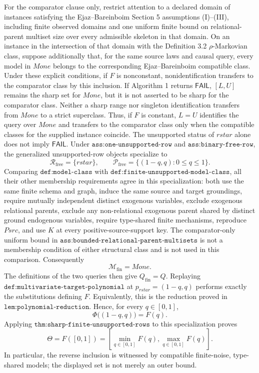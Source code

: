 For the comparator clause only, restrict attention to a declared domain of instances satisfying the Ejaz--Bareinboim Section 5 assumptions (I)--(III), including finite observed domains and one uniform finite bound on relational-parent multiset size over every admissible skeleton in that domain.  On an instance in the intersection of that domain with the Definition 3.2 \(\rho\)-Markovian class, suppose additionally that, for the same source laws and causal query, every model in \(Mone\) belongs to the corresponding Ejaz--Bareinboim compatible class.  Under these explicit conditions, if \(F\) is nonconstant, nonidentification transfers to the comparator class by this inclusion.  If Algorithm 1 returns \(\mathsf{FAIL}\), \([L,U]\) remains the sharp set for \(Mone\), but it is not asserted to be sharp for the comparator class.  Neither a sharp range nor singleton identification transfers from \(Mone\) to a strict superclass.  Thus, if \(F\) is constant, \(L=U\) identifies the query over \(Mone\) and transfers to the comparator class only when the compatible classes for the supplied instance coincide.  The unsupported status of \(rstar\) alone does not imply \(\mathsf{FAIL}\).
Under \(\texttt{ass:one-unsupported-row}\) and
\(\texttt{ass:binary-free-row}\), the generalized unsupported-row objects
specialize to
\[
 \mathcal R_{\mathrm{free}}=\{rstar\},
 \qquad
 \mathcal P_{\mathrm{free}}
 =\{(1-q,q):0\leq q\leq 1\}.
\]
Comparing \(\texttt{def:model-class}\) with
\(\texttt{def:finite-unsupported-model-class}\), all their other
membership requirements agree in this specialization: both use the same
finite schema and graph, induce the same source and target groundings,
require mutually independent distinct exogenous variables, exclude
exogenous relational parents, exclude any non-relational exogenous parent
shared by distinct ground endogenous variables, require type-shared finite
mechanisms, reproduce \(Psrc\), and use \(K\) at every
positive-source-support key.  The comparator-only uniform bound in
\(\texttt{ass:bounded-relational-parent-multisets}\) is not a membership
condition of either structural class and is not used in this comparison.
Consequently
\[
 \mathcal M_{\mathrm{fin}}=Mone.
\]
The definitions of the two queries then give
\(Q_{\mathrm{fin}}=Q\).  Replaying
\(\texttt{def:multivariate-target-polynomial}\) at
\(p_{rstar}=(1-q,q)\) performs exactly the substitutions defining \(F\).
Equivalently, this is the reduction proved in
\(\texttt{lem:polynomial-reduction}\).  Hence, for every \(q\in[0,1]\),
\[
 \Phi\bigl((1-q,q)\bigr)=F(q).
\]
Applying \(\texttt{thm:sharp-finite-unsupported-rows}\) to this
specialization proves
\[
 \Theta=F([0,1])
 =\left[\min_{q\in[0,1]}F(q),\max_{q\in[0,1]}F(q)\right].
\]
In particular, the reverse inclusion is witnessed by compatible
finite-noise, type-shared models; the displayed set is not merely an outer
bound.

